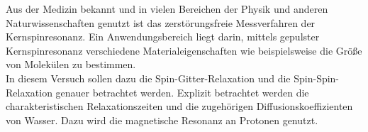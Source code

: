 Aus der Medizin bekannt und in vielen Bereichen der Physik und anderen
Naturwissenschaften genutzt ist das zerstörungsfreie Messverfahren der Kernspinresonanz.
Ein Anwendungsbereich liegt darin, mittels gepulster Kernspinresonanz verschiedene
Materialeigenschaften wie beispielsweise die Größe von Molekülen zu bestimmen. \\
In diesem Versuch sollen dazu die Spin-Gitter-Relaxation und die
Spin-Spin-Relaxation genauer betrachtet werden. Explizit betrachtet werden die
charakteristischen Relaxationszeiten und die zugehörigen
Diffusionskoeffizienten von Wasser. Dazu wird die magnetische Resonanz an
Protonen genutzt.
